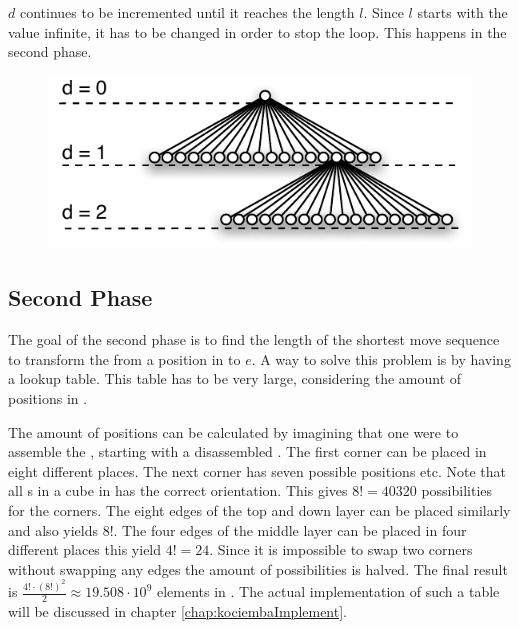 $d$ continues to be incremented until it reaches the length $l$. Since $l$ starts with the value infinite, it has to be changed in order to stop the loop. This happens in the second phase.

\begin{figure}[!hbt]
	\centering
		\includegraphics[scale=0.75]{input/pics/searchExpansion.pdf}
	\caption{}
	\label{fig:searchExpansion}
\end{figure}


\subsection{Second Phase}
\label{sub:secondPhase}
The goal of the second phase is to find the length of the shortest move sequence to transform the \rubik{} from a position in  to $e$. A way to solve this problem is by having a lookup table. This table has to be very large, considering the amount of positions in . 

The amount of positions can be calculated by imagining that one were to assemble the \rubik{}, starting with a disassembled \rubik{}. The first corner \cpiece{} can be placed in eight different places. The next corner has seven possible positions etc. Note that all \cpiece{}s in a cube in  has the correct orientation. 
This gives $8! = 40320$ possibilities for the corners. 
The eight edges of the top and down layer can be placed similarly and also yields $8!$.  
The four edges of the middle layer can be placed in four different places this yield $4! = 24$. Since it is impossible to swap two corners without swapping any edges the amount of possibilities is halved. 
The final result is $\frac{4!\cdot(8!)^{2}}{2} \approx 19.508\cdot10^{9}$ elements in .
The actual implementation of such a table will be discussed in chapter \ref{chap:kociembaImplement}.